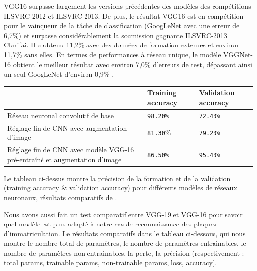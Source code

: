 	VGG16 surpasse largement les versions précédentes des modèles des compétitions ILSVRC-2012 et ILSVRC-2013. De plus, le résultat VGG16 est en compétition pour le vainqueur de la tâche de classification (GoogLeNet avec une erreur de 6,7\%) et surpasse considérablement la soumission gagnante ILSVRC-2013 Clarifai. Il a obtenu 11,2\% avec des données de formation externes et environ 11,7\% sans elles. En termes de performances à réseau unique, le modèle VGGNet-16 obtient le meilleur résultat avec environ 7,0\% d'erreurs de test, dépassant ainsi un seul GoogLeNet d'environ 0,9\% \cite{simonyan2014very}.
	

	\begin{table}[H]
		\begin{tabular}{|p{7cm}|l|l|}
			\hline
			& \textbf{Training accuracy} & \textbf{Validation accuracy} \\
			\hline
			Réseau neuronal convolutif de base & \texttt{98.20\%}  & \texttt{72.40\%} \\
			\hline
			Réglage fin de CNN avec augmentation d'image & \texttt{81.30}\% & \texttt{79.20\%} \\
			\hline
			Réglage fin de CNN avec modèle VGG-16 pré-entraîné et augmentation d'image & \texttt{86.50\%}  & \texttt{95.40\%} \\
			\hline
			
		\end{tabular}
	\end{table}

	Le tableau ci-dessus montre la précision de la formation et de la validation (training accuracy \& validation accuracy) pour différents modèles de réseaux neuronaux, résultats comparatifs de \cite{tammina2019transfer}.
	
	Nous avons aussi fait un test comparatif entre VGG-19 et VGG-16 pour savoir quel modèle est plus adapté à notre cas de reconnaissance des plaques d'immatriculation. Le résultats comparatifs dans le tableau ci-dessous, qui nous montre le nombre total de paramètres, le nombre de paramètres entrainables, le nombre de paramètres non-entrainables, la perte, la précision (respectivement : total params, trainable params, non-trainable params, loss, accuracy).
	

